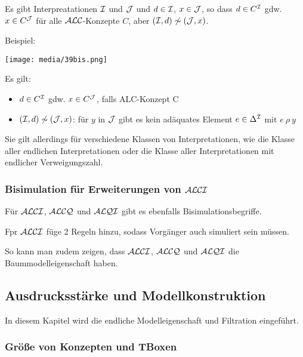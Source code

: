 Es gibt Interpreatationen $\mathcal{I}$ und $\mathcal{J}$ und $d \in \mathcal{I}$, $x \in \mathcal{J}$, so dass $d \in C^{\mathcal{I}}$ gdw. $x \in C^{\mathcal{J}}$ für alle $\mathcal{A}\mathcal{L}\mathcal{C}$-Konzepte $C$, aber $(\mathcal{I},d) \not\sim (\mathcal{J},x)$. 

Beispiel:

\texttt{[image: media/39bis.png]}

Es gilt:

\begin{itemize}
  \item $d \in C^{\mathcal{I}}$ gdw. $x \in C^{\mathcal{J}}$, falls ALC-Konzept C
  \item $(\mathcal{I},d) \not\sim (\mathcal{J},x)$: für $y$ in $\mathcal{J}$ gibt es kein adäquates Element $e \in \Delta^{\mathcal{I}}$ mit $e\ \rho\ y$
\end{itemize}

Sie gilt allerdings für verschiedene Klassen von Interpretationen, wie die Klasse aller endlichen Interpretationen oder die Klasse aller Interpretationen mit endlicher Verweigungszahl.

\subsubsection{Bisimulation für Erweiterungen von \texorpdfstring{$\mathcal{A}\mathcal{L}\mathcal{C}\mathcal{I}$}{ALCI}}\label{bisimulation-in-alci}

Für $\mathcal{A}\mathcal{L}\mathcal{C}\mathcal{I}$, $\mathcal{A}\mathcal{L}\mathcal{C}\mathcal{Q}$ und $\mathcal{A}\mathcal{L}\mathcal{Q}\mathcal{I}$ gibt es ebenfalls Bisimulationsbegriffe.

Fpr $\mathcal{A}\mathcal{L}\mathcal{C}\mathcal{I}$ füge 2 Regeln hinzu, sodass Vorgänger auch simuliert sein müssen.

So kann man zudem zeigen, dass $\mathcal{A}\mathcal{L}\mathcal{C}\mathcal{I}$, $\mathcal{A}\mathcal{L}\mathcal{C}\mathcal{Q}$ und $\mathcal{A}\mathcal{L}\mathcal{Q}\mathcal{I}$ die Baummodelleigenschaft haben.

\subsection{Ausdrucksstärke und
Modellkonstruktion}\label{ausdrucksstuxe4rke-und-modellkonstruktion}

In diesem Kapitel wird die endliche Modelleigenschaft und Filtration eingeführt.

\subsubsection{Größe von Konzepten und
TBoxen}\label{gruxf6uxdfe-von-konzepten-und-tboxen}

